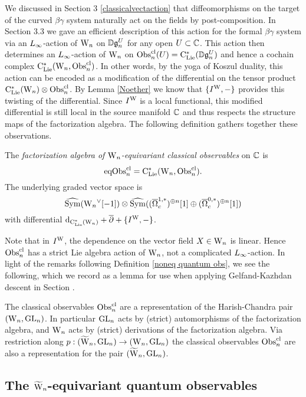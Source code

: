 We discussed in Section 3 \ref{classicalvectaction} that 
diffeomorphisms on the target of the curved $\beta\gamma$ system 
naturally act on the fields by post-composition.
In Section 3.3 we gave an efficient description of this action for the formal $\beta\gamma$ system
via an $\L8$-action of ${{\rm W}_n}$ on $\mathbb D\mathfrak{g}_n^U$ for any open $U \subset \mathbb C$.
This action then determines an $\L8$-action of ${{\rm W}_n}$ on ${\rm Obs}^{\rm cl}_n(U) = {\rm C}_{\rm Lie}^*(\mathbb D\mathfrak{g}_n^U)$
and hence a cochain complex ${\rm C}_{\rm Lie}^*({{\rm W}_n},{\rm Obs}^{\rm cl}_n)$.
In other words, by the yoga of Koszul duality, 
this action can be encoded as a modification of the differential on the tensor product ${\rm C}_{\rm Lie}^*({{\rm W}_n}) \otimes {\rm Obs}^{\rm cl}_n$.
By Lemma \ref{Noether} we know that $\{I^{\rm W},-\}$ provides this twisting of the differential.
Since $I^{\rm W}$ is a local functional, this modified differential is still local in the source manifold $\mathbb C$
and thus respects the structure maps of the factorization algebra.
The following definition gathers together these observations.

\begin{dfn}
The \emph{factorization algebra of ${{\rm W}_n}$-equivariant classical observables} on $\mathbb C$ is
\[
{\rm eqObs}^{\rm cl}_n = {\rm C}_{\rm Lie}^*({{\rm W}_n}, {\rm Obs}^{\rm cl}_n).
\]
The underlying graded vector space is
\[
\widehat{{\rm Sym}}({{\rm W}_n}^\vee[-1]) \otimes \widehat{{\rm Sym}}((\overline{\Omega}^{1,*}_c)^{\oplus n}[1] \oplus (\overline{\Omega}^{0,*}_c)^{\oplus n}[1])
\]
with differential ${\rm d}_{{\rm C}_{\rm Lie}^*({{\rm W}_n})} + \overline{\partial} + \{I^{\rm W},-\}$.
\end{dfn}

Note that in $I^{\rm W}$, the dependence on the vector field $X \in {{\rm W}_n}$ is linear. 
Hence ${\rm Obs}^{\rm cl}_n$ has a strict Lie algebra action of ${{\rm W}_n}$, not a complicated $\L8$-action.
In light of the remarks following Definition \ref{noneq quantum obs}, we see the following,
which we record as a lemma for use when applying Gelfand-Kazhdan descent in Section \label{sec ss GK descent}.

\begin{lemma}
The classical observables ${\rm Obs}^{\rm cl}_n$ are a representation of the Harish-Chandra pair~$({{\rm W}_n},{\rm GL}_n)$.
In particular ${\rm GL}_n$ acts by (strict) automorphisms of the factorization algebra, and
${{\rm W}_n}$ acts by (strict) derivations of the factorization algebra. Via
restriction along $p : (\widetilde{{{\rm W}}}_n, {\rm GL}_n) \to ({{\rm W}_n}, {\rm GL}_n)$ the
classical observables ${\rm Obs}^{{\rm cl}}_n$ are also a representation for the pair
$(\widetilde{{{\rm W}}}_n, {\rm GL}_n)$. 
\end{lemma}

\subsection{The $\widetilde{{{\rm W}}}_n$-equivariant quantum observables}

